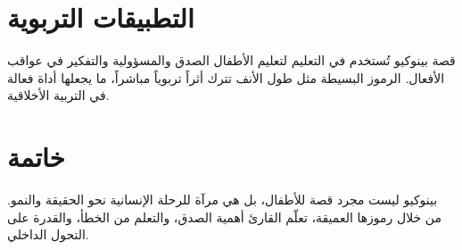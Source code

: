 \documentclass[12pt]{article}
\begin{document}
\section{التطبيقات التربوية} \begin{flushright} قصة بينوكيو تُستخدم في التعليم لتعليم الأطفال الصدق والمسؤولية والتفكير في عواقب الأفعال. الرموز البسيطة مثل طول الأنف تترك أثراً تربوياً مباشراً، ما يجعلها أداة فعالة في التربية الأخلاقية. \end{flushright}

\section{خاتمة} \begin{flushright} بينوكيو ليست مجرد قصة للأطفال، بل هي مرآة للرحلة الإنسانية نحو الحقيقة والنمو. من خلال رموزها العميقة، تعلّم القارئ أهمية الصدق، والتعلم من الخطأ، والقدرة على التحول الداخلي. \end{flushright}
\end{document}
